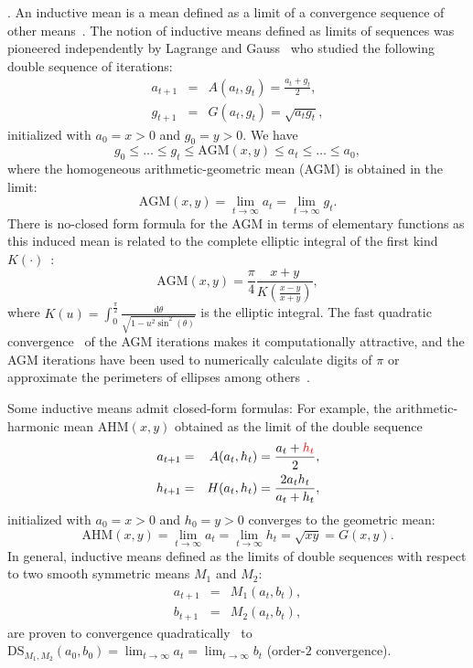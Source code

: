 \documentclass{article}
\def\correction#1{{\color{red}{#1}}}
\def\AGM{\mathrm{AGM}}
\def\AHM{\mathrm{AHM}}
\def\DS{\mathrm{DS}}
\begin{document}
\vskip 0.3cm
.
An inductive mean is a mean defined as a limit of a convergence sequence of other means~\cite{sturm2003probability}.
The notion of inductive means defined as limits of sequences was pioneered independently by Lagrange and Gauss~\cite{borwein1987pi} who studied the following double sequence of iterations: 
\begin{eqnarray*}
a_{t+1} &=& A(a_t,g_t)=\frac{a_t+g_t}{2},\\
g_{t+1} &=& G(a_t,g_t)=\sqrt{a_tg_t},
\end{eqnarray*}
initialized with $a_0=x>0$ and $g_0=y>0$.
We have
$$
g_0\leq \ldots\leq g_t\leq \AGM(x,y)\leq a_t\leq \ldots\leq a_0,
$$
where the homogeneous arithmetic-geometric mean (AGM) is obtained in the limit: 
$$
\AGM(x,y)=\lim_{t\rightarrow\infty} a_t=\lim_{t\rightarrow\infty} g_t.
$$
There is no-closed form formula for the AGM in terms of elementary functions as this induced mean  
 is related to the complete elliptic integral of the first kind $K(\cdot)$~\cite{borwein1987pi}:
$$
\AGM(x,y)=\frac{\pi}{4} \frac{x+y}{K\left(\frac{x-y}{x+y}\right)},
$$
where $K(u)=\int_0^{\frac{\pi}{2}} \frac{\mathrm{d}\theta}{\sqrt{1-u^2\sin^2(\theta)}}$ is the elliptic integral.
The fast quadratic convergence~\cite{ArchimedeanDoubleSequence-1984} of the AGM iterations makes it computationally attractive, and the AGM iterations have been used to numerically calculate digits of $\pi$ or approximate the perimeters of ellipses among others~\cite{borwein1987pi}.

Some inductive means admit closed-form formulas: For example, the arithmetic-harmonic mean $\AHM(x,y)$ obtained as the limit of the double sequence
\begin{eqnarray*}
a_{t+1} &=& A(a_t,h_t)=\frac{a_t+\correction{h_t}}{2},\\
h_{t+1} &=& H(a_t,h_t)=\frac{2a_th_t}{a_t+h_t},
\end{eqnarray*}
initialized with $a_0=x>0$ and $h_0=y>0$
converges to the geometric mean: 
$$
\AHM(x,y)=\lim_{t\rightarrow\infty} a_t=\lim_{t\rightarrow\infty} h_t=\sqrt{xy}=G(x,y).
$$
In general, inductive means defined as the limits of double sequences with respect to two smooth symmetric means $M_1$ and $M_2$:
\begin{eqnarray*}
a_{t+1} &=& M_1(a_t,b_t),\\
b_{t+1} &=& M_2(a_t,b_t),
\end{eqnarray*}
are proven to convergence quadratically~\cite{ArchimedeanDoubleSequence-1984} to $\DS_{M_1,M_2}(a_0,b_0)=\lim_{t\rightarrow \infty} a_t=\lim_{t\rightarrow \infty} b_t$ (order-$2$ convergence).
\end{document}
